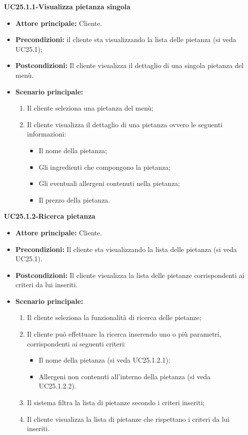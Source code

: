 \textbf{UC25.1.1-Visualizza pietanza singola}
\begin{itemize}
\item \textbf{Attore principale:} Cliente.
\item \textbf{Precondizioni:} il cliente sta visualizzando la lista delle pietanza (si veda UC25.1);
\item \textbf{Postcondizioni:} Il cliente visualizza il dettaglio di una singola pietanza del menù.
\item \textbf{Scenario principale:}
\begin{enumerate}
    \item Il cliente seleziona una pietanza del menù;
    \item Il cliente visualizza il dettaglio di una pietanza ovvero le seguenti informazioni:
    \begin{itemize}
        \item Il nome della pietanza;
        \item Gli ingredienti che compongono la pietanza;
        \item Gli eventuali allergeni contenuti nella pietanza;
        \item Il prezzo della pietanza.
    \end{itemize}
\end{enumerate}
\end{itemize}

\textbf{UC25.1.2-Ricerca pietanza}
\begin{itemize}
\item \textbf{Attore principale:} Cliente.
\item \textbf{Precondizioni:}  Il cliente sta visualizzando la lista delle pietanza (si veda UC25.1).
\item \textbf{Postcondizioni:} Il cliente visualizza la lista delle pietanze corrispondenti ai criteri da lui inseriti.
\item \textbf{Scenario principale:}
\begin{enumerate}
    \item Il cliente seleziona la funzionalità di ricerca delle pietanze;
    \item Il cliente può effettuare la ricerca inserendo uno o più parametri, corrispondenti ai seguenti criteri:
    \begin{itemize}
        \item Il nome della pietanza (si veda UC25.1.2.1);
        \item Allergeni non contenuti all'interno della pietanza (si veda UC25.1.2.2).
    \end{itemize}
    \item Il sistema filtra la lista di pietanze secondo i criteri inseriti;
    \item Il cliente visualizza la lista di pietanze che rispettano i criteri da lui inseriti.
\end{enumerate}
\end{itemize}

